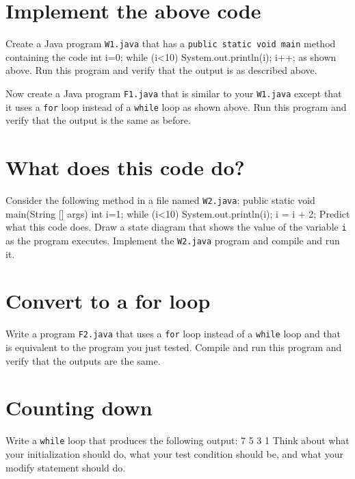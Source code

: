 \documentclass[12pt]{article}
\newenvironment{qv}%
  {\quote
   \verbatim}%
  {\endverbatim
   \endquote}
\begin{document}
\section*{Implement the above code}
Create a Java program \verb'W1.java'
that has a \verb'public static void main' method
containing the code
\begin{qv}
int i=0;
while (i<10) {
  System.out.println(i);
  i++;
}
\end{qv}
as shown above.
Run this program and verify that the output is as described above.


\noindent
Now create a Java program \verb'F1.java'
that is similar to your \verb'W1.java'
except that it uses a \verb'for' loop instead of a \verb'while' loop
as shown above.
Run this program and verify that the output is the same as before.


\section*{What does this code do?}
Consider the following method in a file named \verb'W2.java':
\begin{qv}
public static void main(String [] args) {
    int i=1;
    while (i<10) {
        System.out.println(i);
        i = i + 2;
    }
}
\end{qv}
Predict what this code does.
Draw a state diagram that shows the value of the variable \verb'i'
as the program executes.
Implement the \verb'W2.java' program
and compile and run it.


\section*{Convert to a for loop}
Write a program \verb'F2.java'
that uses a \verb'for' loop instead of a \verb'while' loop
and that is equivalent to the program you just tested.
Compile and run this program
and verify that the outputs are the same.


\section*{Counting down}
Write a \verb'while' loop that produces the following output:
\begin{qv}
9
7
5
3
1
\end{qv}
Think about what your initialization should do,
what your test condition should be,
and what your modify statement should do.
\end{document}
